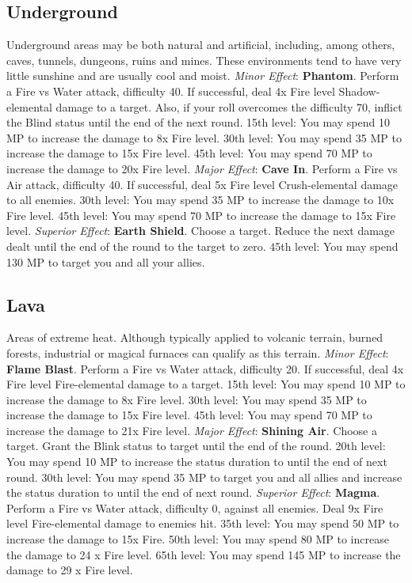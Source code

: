 \begin{multicols}{2}
\subsection{Underground}
\label{subsec:geo-underground}
Underground areas may be both natural and artificial, including, among others, caves, tunnels, dungeons, ruins and mines. These environments tend to have very little sunshine and are usually cool and moist.
\textit{Minor Effect}: \textbf{Phantom}. Perform a Fire vs Water attack, difficulty 40. If successful, deal 4x Fire level Shadow-elemental damage to a target. Also, if your roll overcomes the difficulty 70, inflict the Blind status until the end of the next round. 15th level: You may spend 10 MP to increase the damage to 8x Fire level. 30th level: You may spend 35 MP to increase the damage to 15x Fire level. 45th level: You may spend 70 MP to increase the damage to 20x Fire level.
\textit{Major Effect}: \textbf{Cave In}. Perform a Fire vs Air attack, difficulty 40. If successful, deal 5x Fire level Crush-elemental damage to all enemies. 30th level: You may spend 35 MP to increase the damage to 10x Fire level. 45th level: You may spend 70 MP to increase the damage to 15x Fire level.
\textit{Superior Effect}: \textbf{Earth Shield}. Choose a target. Reduce the next damage dealt until the end of the round to the target to zero. 45th level: You may spend 130 MP to target you and all your allies.

\subsection{Lava}
\label{subsec:geo-lava}
Areas of extreme heat. Although typically applied to volcanic terrain, burned forests, industrial or magical furnaces can qualify as this terrain.
\textit{Minor Effect}: \textbf{Flame Blast}. Perform a Fire vs Water attack, difficulty 20. If successful, deal 4x Fire level Fire-elemental damage to a target. 15th level: You may spend 10 MP to increase the damage to 8x Fire level. 30th level: You may spend 35 MP to increase the damage to 15x Fire level. 45th level: You may spend 70 MP to increase the damage to 21x Fire level.
\textit{Major Effect}: \textbf{Shining Air}. Choose a target. Grant the Blink status to target until the end of the round. 20th level: You may spend 10 MP to increase the status duration to until the end of next round. 30th level: You may spend 35 MP to target you and all allies and increase the status duration to until the end of next round.
\textit{Superior Effect}: \textbf{Magma}. Perform a Fire vs Water attack, difficulty 0, against all enemies. Deal 9x Fire level Fire-elemental damage to enemies hit. 35th level: You may spend 50 MP to increase the damage to 15x Fire. 50th level: You may spend 80 MP to increase the damage to 24 x Fire level. 65th level: You may spend 145 MP to increase the damage to 29 x Fire level.


\end{multicols}
